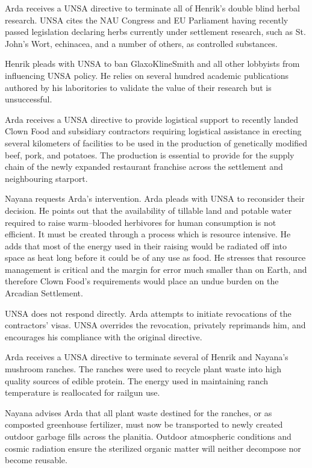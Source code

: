 Arda receives a UNSA directive to terminate all of Henrik's double blind herbal research. UNSA cites the NAU Congress and EU Parliament having recently passed legislation declaring herbs currently under settlement research, such as St. John's Wort, echinacea, and a number of others, as controlled substances.

Henrik pleads with UNSA to ban GlaxoKlineSmith and all other lobbyists from influencing UNSA policy. He relies on several hundred academic publications authored by his laboritories to validate the value of their research but is unsuccessful.
\StopTimelineDate

Arda receives a UNSA directive to provide logistical support to recently landed Clown Food and subsidiary contractors requiring logistical assistance in erecting several kilometers of facilities to be used in the production of genetically modified beef, pork, and potatoes. The production is essential to provide for the supply chain of the newly expanded restaurant franchise across the settlement and neighbouring starport.

Nayana requests Arda's intervention. Arda pleads with UNSA to reconsider their decision. He points out that the availability of tillable land and potable water required to raise warm--blooded herbivores for human consumption is not efficient. It must be created through a process which is resource intensive. He adds that most of the energy used in their raising would be radiated off into space as heat long before it could be of any use as food. He stresses that resource management is critical and the margin for error much smaller than on Earth, and therefore Clown Food's requirements would place an undue burden on the Arcadian Settlement.

UNSA does not respond directly. Arda attempts to initiate revocations of the contractors' visas. UNSA overrides the revocation, privately reprimands him, and encourages his compliance with the original directive.
\StopTimelineDate

Arda receives a UNSA directive to terminate several of Henrik and Nayana's mushroom ranches. The ranches were used to recycle plant waste into high quality sources of edible protein. The energy used in maintaining ranch temperature is reallocated for railgun use. 

Nayana advises Arda that all plant waste destined for the ranches, or as composted greenhouse fertilizer, must now be transported to newly created outdoor garbage fills across the planitia. Outdoor atmospheric conditions and cosmic radiation ensure the sterilized organic matter will neither decompose nor become reusable.
\StopTimelineDate

